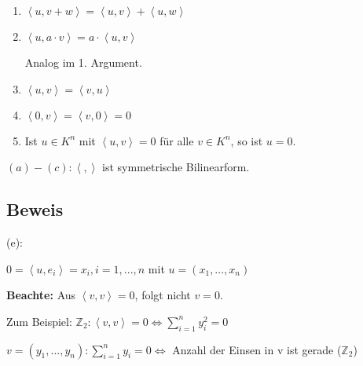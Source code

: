 \documentclass[a4paper, openany]{book}
\begin{document}
\begin{enumerate}[label=(\alph*)]
	\item $\left \langle u, v+w \right \rangle = \left \langle u,v  \right \rangle + \left \langle u,w \right \rangle$

	\item $\left \langle u, a \cdot v \right \rangle = a \cdot \left \langle u,v \right \rangle$

	Analog im 1. Argument.

	\item $\left \langle u, v \right \rangle = \left \langle v, u \right \rangle$

	\item $\left \langle 0, v\right \rangle = \left \langle v, 0 \right \rangle = 0$

	\item Ist $u \in K^n$ mit $\left \langle u, v \right \rangle = 0$ für alle $v \in K^n$, so ist $u = 0$.
\end{enumerate}

$(a)-(c): \left \langle , \right \rangle$ ist symmetrische Bilinearform.

\subsection{Beweis}

(e):

$0 = \left \langle u, e_i \right \rangle = x_i, i=1, ..., n$ mit $u = (x_1, ..., x_n)$

\par \medskip

\textbf{Beachte:} Aus $\left \langle v, v \right \rangle = 0$, folgt nicht $v = 0$.

\par \medskip

Zum Beispiel: $\mathbb{Z}_2: \left \langle v, v \right \rangle = 0 \Leftrightarrow \sum_{i=1}^n y_i^2 = 0$

\par \medskip

$v = (y_1, ..., y_n) : \sum_{i=1}^n y_i = 0 \Leftrightarrow$ Anzahl der Einsen in v ist gerade ($\mathbb{Z}_2$)
\end{document}
